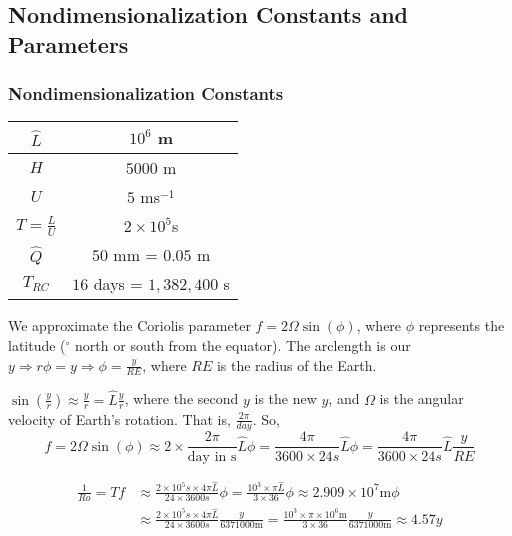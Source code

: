\documentclass[10pt]{article}
\begin{document}
\subsection*{Nondimensionalization Constants and Parameters}

\subsubsection*{Nondimensionalization Constants}
\begin{center}
	\begin{tabular}{ |c|c| } 
		\hline
		$\hat{L}$ & $10^6$ m \\ \hline
		$H$ & $5000$ m \\ \hline
		$U$ & $5$ ms$^{-1}$ \\ \hline
		$T = \frac{L}{U}$ &$2 \times 10^5 $s \\ \hline
		$\hat{Q}$ & $50$ mm = $0.05$ m \\ \hline
		$T_{RC}$ & $16$ days = $1,382,400$ s \\ \hline
	\end{tabular}
\end{center}

We approximate the Coriolis parameter $f= 2 \Omega \sin(\phi)$, where $\phi$ represents the latitude ($^{\circ}$ north or south from the equator). The arclength is our $y \Rightarrow r\phi = y \Rightarrow \phi = \frac{y}{RE}$, where $RE$ is the radius of the Earth. 

$\sin(\frac{y}{r})\approx \frac{y}{r} = \hat{L} \frac{y}{r}$, where the second $y$ is the new $y$, and $\Omega$ is the angular velocity of Earth's rotation. That is, $\frac{2\pi}{day}$. So, 
\begin{equation*}
f = 2\Omega \sin(\phi )\approx 2 \times \frac{2\pi}{\text{day in s}} \hat{L}\phi = \frac{4\pi}{3600\times 24 s} \hat{L} \phi = \frac{4\pi}{3600\times 24 s} \hat{L} \frac{y}{RE}
\end{equation*}

\begin{align*}
\frac{1}{Ro} = Tf & \approx \frac{2\times 10^5 s \times 4\pi \hat{L}}{24 \times 3600s} \phi = \frac{10^3 \times \pi \hat{L}}{3 \times 36} \phi \approx 2.909 \times 10^7 \text{m}  \phi \\
&\approx \frac{2\times 10^5 s \times 4\pi \hat{L}}{24 \times 3600s} \frac{y}{6371000\text{m}} = \frac{10^3 \times \pi \times 10^6 \text{m}}{3 \times 36} \frac{y}{6371000\text{m}} \approx 4.57 y
\end{align*}
\end{document}
